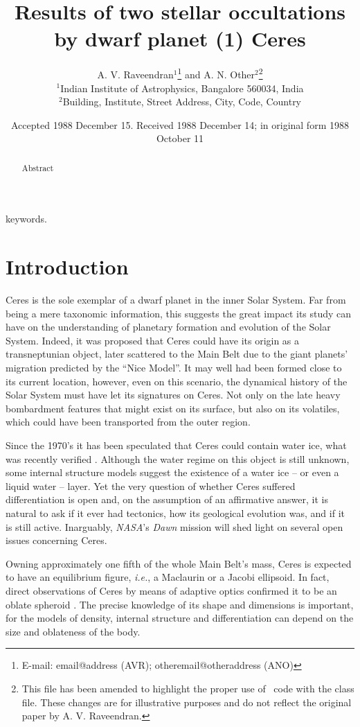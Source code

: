 \documentclass[useAMS,usenatbib]{mn2e}
\title[Results of two stellar occultations by Ceres]{Results of two stellar occultations by dwarf planet (1) Ceres}
\author[A. V. Raveendran and A. N. Other]{A. V. Raveendran$^{1}$\thanks{E-mail:
email@address (AVR); otheremail@otheraddress (ANO)} and A. N.
Other$^{2}$\footnotemark[1]\thanks{This file has been amended to
highlight the proper use of \LaTeXe\ code with the class file.
These changes are for illustrative purposes and do not reflect the
original paper by A. V. Raveendran.}\\
$^{1}$Indian Institute of Astrophysics, Bangalore 560034, India\\
$^{2}$Building, Institute, Street Address, City, Code, Country}
\begin{document}
\date{Accepted 1988 December 15. Received 1988 December 14; in original form 1988 October 11}

\pagerange{\pageref{firstpage}--\pageref{lastpage}} 

\maketitle

\label{firstpage}

\begin{abstract}
Abstract
\end{abstract}

\begin{keywords}
keywords.
\end{keywords}

\section{Introduction}

Ceres is the sole exemplar of a dwarf planet in the inner Solar System. Far from being a mere taxonomic information, this suggests the great impact its study can have on the understanding of planetary formation and evolution of the Solar System. Indeed, it was proposed that Ceres could have its origin as a transneptunian object, later scattered to the Main Belt due to the giant planets' migration predicted by the ``Nice Model''. It may well had been formed close to its current location, however, even on this scenario, the dynamical history of the Solar System must have let its signatures on Ceres. Not only on the late heavy bombardment features that might exist on its surface, but also on its volatiles, which could have been transported from the outer region.

Since the 1970's it has been speculated that Ceres could contain water ice, what was recently verified \citep{Kuppers2014}. Although the water regime on this object is still unknown, some internal structure models suggest the existence of a water ice -- or even a liquid water -- layer. Yet the very question of whether Ceres suffered differentiation is open and, on the assumption of an affirmative answer, it is natural to ask if it ever had tectonics, how its geological evolution was, and if it is still active. Inarguably, \textit{NASA}'s \textit{Dawn} mission will shed light on several open issues concerning Ceres.

Owning approximately one fifth of the whole Main Belt's mass, Ceres is expected to have an equilibrium figure, \textit{i.e.}, a Maclaurin or a Jacobi ellipsoid. In fact, direct observations of Ceres by means of adaptive optics confirmed it to be an oblate spheroid \citep{Drummond2014}. The precise knowledge of its shape and dimensions is important, for the models of density, internal structure and differentiation can depend on the size and oblateness of the body.
\end{document}
